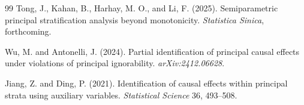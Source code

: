 \documentclass[11pt]{article}
\theoremstyle{definition}
\theoremstyle{plain}
\theoremstyle{remark}
\begin{document}
\begin{thebibliography}{99}
Tong, J., Kahan, B., Harhay, M. O., and Li, F. (2025).
Semiparametric principal stratification analysis beyond monotonicity.
\emph{Statistica Sinica}, forthcoming.

Wu, M. and Antonelli, J. (2024).
Partial identification of principal causal effects under violations of principal ignorability.
\emph{arXiv:2412.06628}.

Jiang, Z. and Ding, P. (2021).
Identification of causal effects within principal strata using auxiliary variables.
\emph{Statistical Science} 36, 493--508.
\end{thebibliography}
\end{document}
